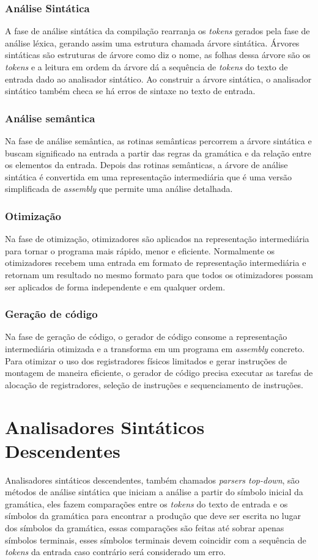 \subsubsection{Análise Sintática}
A fase de análise sintática da compilação rearranja os \textit{tokens} gerados pela fase de análise léxica, gerando assim uma estrutura chamada árvore sintática. Árvores sintáticas são estruturas de árvore como diz o nome, as folhas dessa árvore são os \textit{tokens} e a leitura em ordem da árvore dá a sequência de \textit{tokens} do texto de entrada dado ao analisador sintático. Ao construir a árvore sintática, o analisador sintático também checa se há erros de sintaxe no texto de entrada.

\subsubsection{Análise semântica}
Na fase de análise semântica, as rotinas semânticas percorrem a árvore sintática e buscam significado na entrada a partir das regras da gramática e da relação entre os elementos da entrada. Depois das rotinas semânticas, a árvore de análise sintática é convertida em uma representação intermediária que é uma versão simplificada de \textit{assembly} que permite uma análise detalhada.

\subsubsection{Otimização}
Na fase de otimização, otimizadores são aplicados na representação intermediária para tornar o programa mais rápido, menor e eficiente. Normalmente os otimizadores recebem uma entrada em formato de representação intermediária e retornam um resultado no mesmo formato para que todos os otimizadores possam ser aplicados de forma independente e em qualquer ordem.

\subsubsection{Geração de código}
Na fase de geração de código, o gerador de código consome a representação intermediária otimizada e a transforma em um programa em \textit{assembly} concreto. Para otimizar o uso dos registradores físicos limitados e gerar instruções de montagem de maneira eficiente, o gerador de código precisa executar as tarefas de alocação de registradores, seleção de instruções e sequenciamento de instruções.

\section{Analisadores Sintáticos Descendentes}
Analisadores sintáticos descendentes, também chamados \textit{parsers top-down}, são métodos de análise sintática que iniciam a análise a partir do símbolo inicial da gramática, eles fazem comparações entre os \textit{tokens} do texto de entrada e os símbolos da gramática para encontrar a produção que deve ser escrita no lugar dos símbolos da gramática, essas comparações são feitas até sobrar apenas símbolos terminais, esses símbolos terminais devem coincidir com a sequência de \textit{tokens} da entrada caso contrário será considerado um erro.

